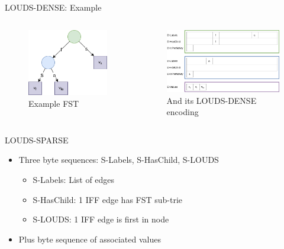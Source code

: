\documentclass{beamer}
\begin{document}
\begin{frame}{LOUDS-DENSE: Example}
		\begin{columns}
				\begin{figure}
						\centering
						\includegraphics[width=\textwidth]{resources/louds_trie}
						\caption{Example FST}
				\end{figure}
				\begin{figure}
						\centering
						\includegraphics[width=\textwidth]{resources/louds_dense}
						\caption{And its LOUDS-DENSE encoding}
				\end{figure}
		\end{columns}
\end{frame}

\begin{frame}{LOUDS-SPARSE}
		\begin{itemize}
				\item Three byte sequences: S-Labels, S-HasChild, S-LOUDS
						\begin{itemize}
								\item S-Labels: List of edges
								\item S-HasChild: 1 IFF edge has FST sub-trie
								\item S-LOUDS: 1 IFF edge is first in node
						\end{itemize}
				\item Plus byte sequence of associated values
		\end{itemize}
\end{frame}
\end{document}
